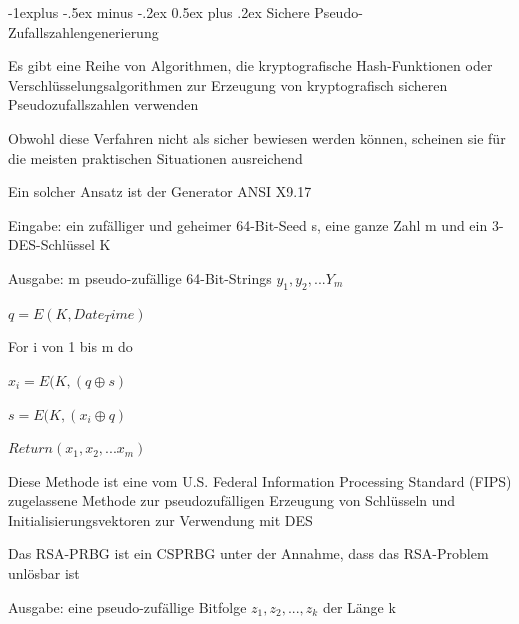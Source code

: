 \documentclass[a4paper]{article}
\makeatletter
\renewcommand{\subsection}{\@startsection{subsection}{2}{0mm}%
 {-1explus -.5ex minus -.2ex}%
 {0.5ex plus .2ex}%
 {\normalfont\normalsize\bfseries}}
\makeatother
\begin{document}
\begin{multicols}{3}
      \subsection{Sichere Pseudo-Zufallszahlengenerierung}
      \begin{itemize*}
            \item Es gibt eine Reihe von Algorithmen, die kryptografische Hash-Funktionen oder Verschlüsselungsalgorithmen zur Erzeugung von kryptografisch sicheren Pseudozufallszahlen verwenden
            \item Obwohl diese Verfahren nicht als sicher bewiesen werden können, scheinen sie für die meisten praktischen Situationen ausreichend
            \item Ein solcher Ansatz ist der Generator ANSI X9.17
            \begin{itemize*}
                  \item Eingabe: ein zufälliger und geheimer 64-Bit-Seed s, eine ganze Zahl m und ein 3-DES-Schlüssel K
                  \item Ausgabe: m pseudo-zufällige 64-Bit-Strings $y_1,y_2,...Y_m$
                  \begin{enumerate*}
                        \item $q = E(K, Date_Time)$
                        \item For i von 1 bis m do
                        \begin{enumerate*}
                              \item $x_i = E(K, (q\oplus s)$
                              \item $s = E(K, (x_i\oplus q)$
                        \end{enumerate*}
                        \item $Return(x_1,x_2,...x_m)$
                  \end{enumerate*}
                  \item Diese Methode ist eine vom U.S. Federal Information Processing Standard (FIPS) zugelassene Methode zur pseudozufälligen Erzeugung von Schlüsseln und Initialisierungsvektoren zur Verwendung mit DES
            \end{itemize*}
            \item Das RSA-PRBG ist ein CSPRBG unter der Annahme, dass das RSA-Problem unlösbar ist
            \begin{itemize*}
                  \item Ausgabe: eine pseudo-zufällige Bitfolge $z_1,z_2,...,z_k$ der Länge k

\end{itemize*}
\end{itemize*}
\end{multicols}
\end{document}
